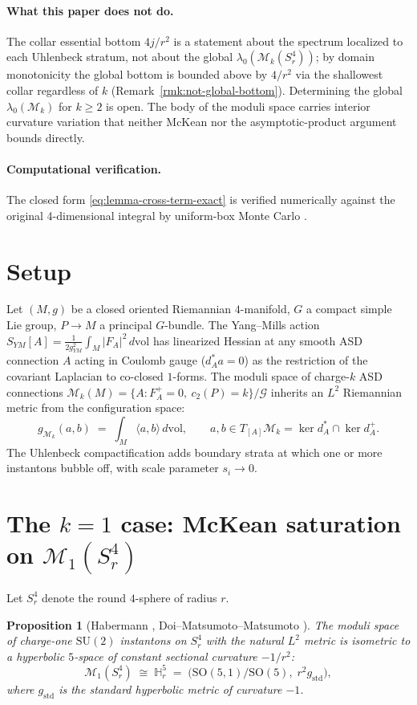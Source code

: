 \documentclass[11pt,letterpaper]{article}
\newtheorem{proposition}[theorem]{Proposition}
\theoremstyle{definition}
\newcommand{\bbH}{\mathbb{H}}
\newcommand{\cG}{\mathcal{G}}
\newcommand{\cM}{\mathcal{M}}
\newcommand{\dvol}{\,d\mathrm{vol}}
\begin{document}
\paragraph{What this paper does not do.} The collar essential bottom $4j/r^2$ is a statement about the spectrum localized to each Uhlenbeck stratum, not about the global $\lambda_0(\cM_k(S^4_r))$; by domain monotonicity the global bottom is bounded above by $4/r^2$ via the shallowest collar regardless of $k$ (Remark~\ref{rmk:not-global-bottom}). Determining the global $\lambda_0(\cM_k)$ for $k \ge 2$ is open. The body of the moduli space carries interior curvature variation that neither McKean nor the asymptotic-product argument bounds directly.

\paragraph{Computational verification.} The closed form \eqref{eq:lemma-cross-term-exact} is verified numerically against the original 4-dimensional integral by uniform-box Monte Carlo \cite{lemma-schwinger-script}.

\section{Setup}\label{sec:setup}

Let $(M, g)$ be a closed oriented Riemannian $4$-manifold, $G$ a compact simple Lie group, $P \to M$ a principal $G$-bundle. The Yang--Mills action $S_{YM}[A] = \tfrac{1}{2g_{YM}^2}\int_M |F_A|^2\dvol$ has linearized Hessian at any smooth ASD connection $A$ acting in Coulomb gauge ($d_A^* a = 0$) as the restriction of the covariant Laplacian to co-closed $1$-forms. The moduli space of charge-$k$ ASD connections $\cM_k(M) = \{A : F_A^+ = 0,\ c_2(P) = k\}/\cG$ inherits an $L^2$ Riemannian metric from the configuration space:
\[
g_{\cM_k}(a, b) \;=\; \int_M \langle a, b\rangle\dvol, \qquad a, b \in T_{[A]}\cM_k = \ker d_A^* \cap \ker d_A^+.
\]
The Uhlenbeck compactification adds boundary strata at which one or more instantons bubble off, with scale parameter $s_i \to 0$.

\section{The $k=1$ case: McKean saturation on $\cM_1(S^4_r)$}\label{sec:M1}

Let $S^4_r$ denote the round $4$-sphere of radius $r$.

\begin{proposition}[Habermann \cite{Habermann1993}, Doi--Matsumoto--Matsumoto \cite{DMM1987}]\label{prop:M1-iso}
The moduli space of charge-one $\mathrm{SU}(2)$ instantons on $S^4_r$ with the natural $L^2$ metric is isometric to a hyperbolic $5$-space of constant sectional curvature $-1/r^2$:
\[
\cM_1(S^4_r) \;\cong\; \bbH^5_r \;=\; \bigl(\mathrm{SO}(5,1)/\mathrm{SO}(5),\; r^2 g_{\mathrm{std}}\bigr),
\]
where $g_{\mathrm{std}}$ is the standard hyperbolic metric of curvature $-1$.
\end{proposition}
\end{document}
